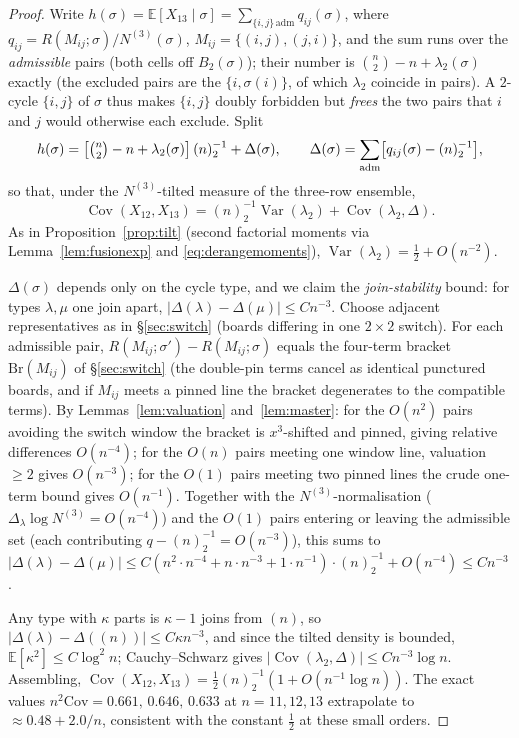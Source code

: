 \documentclass[11pt]{article}
\theoremstyle{definition}
\newcommand{\E}{\mathbb{E}}
\begin{document}
\begin{proof}
Write $h(\sigma)=\E[X_{13}\mid\sigma]=\sum_{\{i,j\}\,\mathrm{adm}}
q_{ij}(\sigma)$, where $q_{ij}=R(M_{ij};\sigma)/N^{(3)}(\sigma)$,
$M_{ij}=\{(i,j),(j,i)\}$, and the sum runs over the \emph{admissible}
pairs (both cells off $B_2(\sigma)$); their number is
$\binom n2-n+\lambda_2(\sigma)$ exactly (the excluded pairs are the
$\{i,\sigma(i)\}$, of which $\lambda_2$ coincide in pairs).  A $2$-cycle
$\{i,j\}$ of $\sigma$ thus makes $\{i,j\}$ doubly forbidden but
\emph{frees} the two pairs that $i$ and $j$ would otherwise each
exclude.  Split
\[
h(\sigma)=\bigl[\tbinom n2-n+\lambda_2(\sigma)\bigr]\,(n)_2^{-1}
+\Delta(\sigma),\qquad
\Delta(\sigma)=\sum_{\mathrm{adm}}\bigl[q_{ij}(\sigma)-(n)_2^{-1}\bigr],
\]
so that, under the $N^{(3)}$-tilted measure of the three-row ensemble,
\[
\operatorname{Cov}(X_{12},X_{13})
=(n)_2^{-1}\operatorname{Var}(\lambda_2)
+\operatorname{Cov}(\lambda_2,\Delta).
\]
As in Proposition~\ref{prop:tilt} (second factorial moments via
Lemma~\ref{lem:fusionexp} and \eqref{eq:derangemoments}),
$\operatorname{Var}(\lambda_2)=\tfrac12+O(n^{-2})$.

$\Delta(\sigma)$ depends only on the cycle type, and we claim the
\emph{join-stability} bound: for types $\lambda,\mu$ one join apart,
$|\Delta(\lambda)-\Delta(\mu)|\le Cn^{-3}$.  Choose adjacent
representatives as in \S\ref{sec:switch} (boards differing in one
$2\times2$ switch).  For each admissible pair,
$R(M_{ij};\sigma')-R(M_{ij};\sigma)$ equals the four-term bracket
$\mathrm{Br}(M_{ij})$ of \S\ref{sec:switch} (the double-pin terms cancel
as identical punctured boards, and if $M_{ij}$ meets a pinned line the
bracket degenerates to the compatible terms).  By
Lemmas~\ref{lem:valuation} and~\ref{lem:master}: for the
$O(n^2)$ pairs avoiding the switch window the bracket is $x^3$-shifted
and pinned, giving relative differences $O(n^{-4})$; for the $O(n)$
pairs meeting one window line, valuation $\ge2$ gives $O(n^{-3})$; for
the $O(1)$ pairs meeting two pinned lines the crude one-term bound gives
$O(n^{-1})$.  Together with the $N^{(3)}$-normalisation
($\Delta_\lambda\log N^{(3)}=O(n^{-4})$) and the $O(1)$ pairs entering
or leaving the admissible set (each contributing
$q-(n)_2^{-1}=O(n^{-3})$), this sums to
$|\Delta(\lambda)-\Delta(\mu)|\le C(n^2\cdot n^{-4}+n\cdot n^{-3}+1\cdot
n^{-1})\cdot(n)_2^{-1}+O(n^{-4})\le Cn^{-3}$.

Any type with $\kappa$ parts is $\kappa-1$ joins from $(n)$, so
$|\Delta(\lambda)-\Delta((n))|\le C\kappa n^{-3}$, and since the tilted
density is bounded, $\E[\kappa^2]\le C\log^2 n$; Cauchy--Schwarz gives
$|\operatorname{Cov}(\lambda_2,\Delta)|\le Cn^{-3}\log n$.  Assembling,
$\operatorname{Cov}(X_{12},X_{13})=\tfrac12(n)_2^{-1}(1+O(n^{-1}\log n))$.
The exact values $n^2\mathrm{Cov}=0.661,\,0.646,\,0.633$ at $n=11,12,13$
extrapolate to $\approx0.48+2.0/n$, consistent with the constant
$\tfrac12$ at these small orders.
\end{proof}
\end{document}
